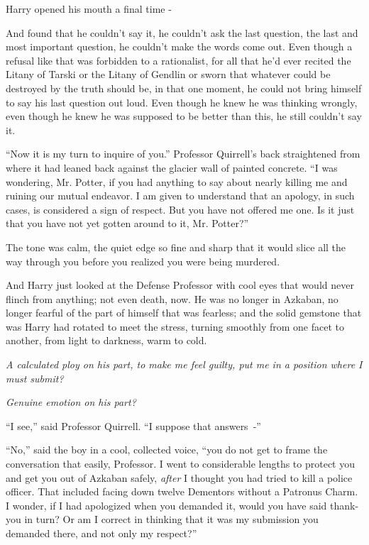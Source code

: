 Harry opened his mouth a final time -

And found that he couldn't say it, he couldn't ask the last question, the last and most important question, he couldn't make the words come out. Even though a refusal like that was forbidden to a rationalist, for all that he'd ever recited the Litany of Tarski or the Litany of Gendlin or sworn that whatever could be destroyed by the truth should be, in that one moment, he could not bring himself to say his last question out loud. Even though he knew he was thinking wrongly, even though he knew he was supposed to be better than this, he still couldn't say it.

``Now it is my turn to inquire of you.'' Professor Quirrell's back straightened from where it had leaned back against the glacier wall of painted concrete. ``I was wondering, Mr. Potter, if you had anything to say about nearly killing me and ruining our mutual endeavor. I am given to understand that an apology, in such cases, is considered a sign of respect. But you have not offered me one. Is it just that you have not yet gotten around to it, Mr. Potter?''

The tone was calm, the quiet edge so fine and sharp that it would slice all the way through you before you realized you were being murdered.

And Harry just looked at the Defense Professor with cool eyes that would never flinch from anything; not even death, now. He was no longer in Azkaban, no longer fearful of the part of himself that was fearless; and the solid gemstone that was Harry had rotated to meet the stress, turning smoothly from one facet to another, from light to darkness, warm to cold.

\emph{A calculated ploy on his part, to make me feel guilty, put me in a position where I must submit?}

\emph{Genuine emotion on his part?}

``I see,'' said Professor Quirrell. ``I suppose that answers~-''

``No,'' said the boy in a cool, collected voice, ``you do not get to frame the conversation that easily, Professor. I went to considerable lengths to protect you and get you out of Azkaban safely, \emph{after} I thought you had tried to kill a police officer. That included facing down twelve Dementors without a Patronus Charm. I wonder, if I had apologized when you demanded it, would you have said thank-you in turn? Or am I correct in thinking that it was my submission you demanded there, and not only my respect?''

